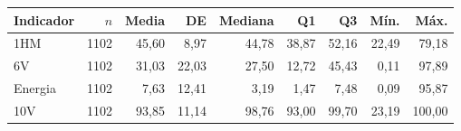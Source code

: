 \begin{tabular}{@{}lrrrrrrrr@{}}
\toprule
Indicador & $n$ & Media & DE & Mediana & Q1 & Q3 & Mín. & Máx. \\
\midrule
1HM & 1102 & 45,60 & 8,97 & 44,78 & 38,87 & 52,16 & 22,49 & 79,18 \\
6V & 1102 & 31,03 & 22,03 & 27,50 & 12,72 & 45,43 & 0,11 & 97,89 \\
Energia & 1102 & 7,63 & 12,41 & 3,19 & 1,47 & 7,48 & 0,09 & 95,87 \\
10V & 1102 & 93,85 & 11,14 & 98,76 & 93,00 & 99,70 & 23,19 & 100,00 \\
\bottomrule
\end{tabular}
